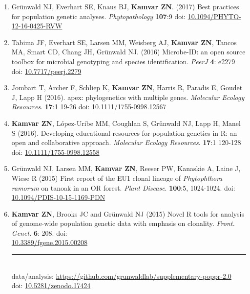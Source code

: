 \begin{enumerate}[leftmargin = 14pt]
	\vspace{3pt}

	\item Gr\"unwald NJ, Everhart SE, Knaus BJ, \textbf{Kamvar ZN}. (2017)
	Best practices for population genetic analyses. \textit{Phytopathology}
	\textbf{107}:9 doi: \href{http://doi.org/10.1094/PHYTO-12-16-0425-RVW}{10.1094/PHYTO-12-16-0425-RVW}

	\vspace{3pt}

	\item Tabima JF, Everhart SE, Larsen MM, Weisberg AJ, \textbf{Kamvar ZN}, Tancos MA,
	Smart CD, Chang JH, Gr\"unwald NJ. (2016) Microbe-ID: an open source toolbox
	for microbial genotyping and species identification. \textit{PeerJ} \textbf{4}: e2279
	doi: \href{https://doi.org/10.7717/peerj.2279}{10.7717/peerj.2279}

	\vspace{3pt}

	\item Jombart T, Archer F, Schliep K, \textbf{Kamvar ZN}, Harris R, Paradis
	E, Goudet J, Lapp H (2016). apex: phylogenetics with multiple genes.
	\textit{Molecular Ecology Resources}. \textbf{17}:1 19-26 doi:
	\href{http://doi.org/10.1111/1755-0998.12567}{10.1111/1755-0998.12567}

	\vspace{3pt}

	\item \textbf{Kamvar ZN}, L\'opez-Uribe MM, Coughlan S, Gr\"unwald NJ, Lapp
	H, Manel S (2016). Developing educational resources for population genetics
	in R: an open and collaborative approach. \textit{Molecular Ecology Resources}.
	\textbf{17}:1 120-128 doi:
	\href{http://doi.org/10.1111/1755-0998.12558}{10.1111/1755-0998.12558}

	\vspace{3pt}

	\item Gr\"unwald NJ, Larsen MM, \textbf{Kamvar ZN}, Reeser PW, Kanaskie A,
	Laine J, Wiese R (2015) First report of the EU1 clonal lineage of
	\textit{Phytophthora ramorum} on tanoak in an OR forest.
	\textit{Plant Disease}. \textbf{100}:5, 1024-1024. doi:
	\href{http://doi.org/10.1094/PDIS-10-15-1169-PDN}{10.1094/PDIS-10-15-1169-PDN}

	\vspace{3pt}

	\item \textbf{Kamvar ZN}, Brooks JC and Gr\"unwald NJ (2015) Novel R tools for
	analysis of genome-wide population genetic data with emphasis on clonality.
	\textit{Front. Genet.} \textbf{6}: 208. doi: \\
	\href{http://doi.org/10.3389/fgene.2015.00208}{10.3389/fgene.2015.00208}\\
	\rule[0.25\baselineskip]{0.25\textwidth}{0.5pt}\\
	data/analysis:
	\href{https://github.com/grunwaldlab/supplementary-poppr-2.0#readme}{https://github.com/grunwaldlab/supplementary-poppr-2.0}\\
	doi:\phantom{t/analysis:}
	\href{https://doi.org/10.5281/zenodo.17424}{10.5281/zenodo.17424}


\end{enumerate}
